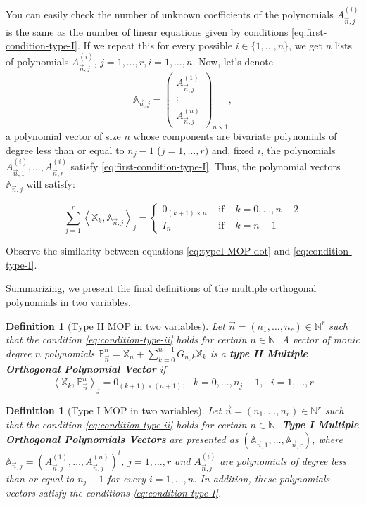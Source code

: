 \documentclass[12pt,a4]{article}
\theoremstyle{plain}
\newtheorem{definition}[theorem]{Definition}
\newcommand{\N}[0]{\mathbb{N}}
\newcommand{\prodesc}[2]{\left\langle #1 , #2 \right\rangle}
\begin{document}
You can easily check the number of unknown coefficients of the polynomials $A_{\vec n,j}^{(i)}$ is the same as the number of linear equations given by conditions \eqref{eq:first-condition-type-I}. If we repeat this for every possible $i\in\{1,\dots,n\}$, we get $n$ lists of polynomials $A_{\vec n, j}^{(i)}$, $j=1,\dots,r, i=1,\dots,n$. Now, let's denote
$$
\mathbb A_{\vec n,j} = \begin{pmatrix}
    A_{\vec n, j}^{(1)} \\ \vdots \\ A_{\vec n, j}^{(n)}
\end{pmatrix}_{n\times 1},
$$
a polynomial vector of size $n$ whose components are bivariate polynomials of degree less than or equal to $n_j-1$ ($j=1,\dots,r$) and, fixed $i$, the polynomials $A_{\vec n, 1}^{(i)},\dots,A_{\vec n, r}^{(i)}$ satisfy \eqref{eq:first-condition-type-I}. Thus, the polynomial vectors $\mathbb A_{\vec n,j}$ will satisfy:

\begin{equation}
    \label{eq:condition-type-I}
    \sum_{j=1}^r \prodesc{\mathbb X_k}{\mathbb A_{\vec n,j}}_j = \left\{\begin{array}{ccl}
        0_{(k+1)\times n} &   \text{ if } & k=0,\dots,n-2 \\
        I_n & \text{ if } & k=n-1      
    \end{array}\right.
\end{equation}

Observe the similarity between equations \eqref{eq:typeI-MOP-dot} and \eqref{eq:condition-type-I}.
    
Summarizing, we present the final definitions of the multiple orthogonal polynomials in two variables.

\begin{definition}[Type II MOP in two variables]
    Let $\vec n = (n_1, \dots, n_r)\in \N^r$ such that the condition \eqref{eq:condition-type-ii} holds for certain $n\in\N$. A vector of monic degree $n$ polynomials $\mathbb P_{\vec n}^n = \mathbb X_n + \displaystyle\sum_{k=0}^{n-1} G_{n,k} \mathbb X_k$ is a \textbf{type II Multiple Orthogonal Polynomial Vector} if 
    \begin{equation}
        \prodesc{\mathbb X_k}{\mathbb P_{\vec n}^n}_j = 0_{(k+1)\times (n+1)}, \ \ \ k=0,\dots,n_j-1, \ \ \ i=1,\dots,r
    \end{equation}      
\end{definition}

\begin{definition}[Type I MOP in two variables]
    Let $\vec n = (n_1, \dots, n_r)\in \N^r$ such that the condition \eqref{eq:condition-type-ii} holds for certain $n\in\N$. \textbf{Type I Multiple Orthogonal Polynomials Vectors} are presented as $(\mathbb A_{\vec n,1}, \dots, \mathbb A_{\vec n,r})$, where 
    $\mathbb A_{\vec n,j}=(A_{\vec n,j}^{(1)}, \dots, A_{\vec n,j}^{(n)})^t$, $j=1,\dots,r$ and $A_{\vec n,j}^{(i)}$ are polynomials of degree less than or equal to $n_j-1$ for every $i=1,\dots,n$. In addition, these polynomials vectors satisfy the conditions \eqref{eq:condition-type-I}.     
\end{definition}
\end{document}
